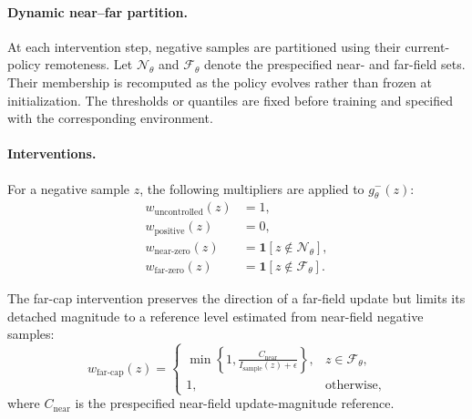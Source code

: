 \documentclass[sigconf,anonymous,review]{acmart}
\theoremstyle{acmdefinition}
\begin{document}
\paragraph{Dynamic near--far partition.}
At each intervention step, negative samples are partitioned using their
current-policy remoteness. Let
$\mathcal N_\theta$
and
$\mathcal F_\theta$
denote the prespecified near- and far-field sets. Their membership is
recomputed as the policy evolves rather than frozen at initialization.
The thresholds or quantiles are fixed before training and specified with the
corresponding environment.

\paragraph{Interventions.}
For a negative sample $z$, the following multipliers are applied to
$g_\theta^-(z)$:
\begin{equation}
\begin{aligned}
    w_{\mathrm{uncontrolled}}(z)
    &=1,\\
    w_{\mathrm{positive}}(z)
    &=0,\\
    w_{\mathrm{near\text{-}zero}}(z)
    &=
    \mathbf 1[z\notin\mathcal N_\theta],\\
    w_{\mathrm{far\text{-}zero}}(z)
    &=
    \mathbf 1[z\notin\mathcal F_\theta].
\end{aligned}
\label{eq:causal_zero_interventions}
\end{equation}

The far-cap intervention preserves the direction of a far-field update
but limits its detached magnitude to a reference level estimated from
near-field negative samples:
\begin{equation}
    w_{\mathrm{far\text{-}cap}}(z)
    =
    \begin{cases}
        \displaystyle
        \min\left\{
            1,
            \frac{C_{\mathrm{near}}}
                 {I_{\mathrm{sample}}(z)+\epsilon}
        \right\},
        & z\in\mathcal F_\theta,\\[3mm]
        1,
        & \text{otherwise},
    \end{cases}
    \label{eq:causal_far_cap}
\end{equation}
where $C_{\mathrm{near}}$ is the prespecified near-field update-magnitude
reference.
\end{document}
